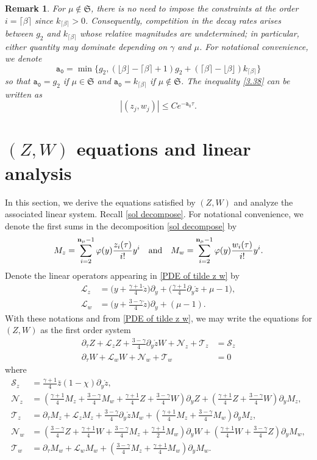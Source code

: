 \documentclass{article}
\newcommand{\ga}{\gamma}
\newcommand{\pa}{\partial}
\def\be{\begin{equation}}
\def\ee{\end{equation}}
\def\beqa{\begin{equation}\begin{aligned}}
\def\eeqa{\end{aligned}\end{equation}}
\def\espz{Z}
\def\espw{W}
\def\mz{M_z}
\def\mw{M_w}
\def\lz{\mathcal L_z}
\def\lw{\mathcal L_w}
\def\nz{\mathcal N_z}
\def\nw{\mathcal N_w}
\def\nmz{\mathcal T_z}
\def\nmw{\mathcal T_w}
\def\epzero{\mathtt{a_0}}
\def\ssmu{\mathfrak S}
\def\ndmu{{\bf{n}_{\mu}}}
\numberwithin{equation}{section}
\newtheorem{remark}[theorem]{Remark}
\begin{document}
\begin{remark}
    For $\mu\notin \ssmu$, there is no need to impose the constraints at the order $i=\lceil \beta \rceil$ since $k_{\lceil \beta \rceil}>0$. Consequently, competition in the decay rates arises between $g_2$ and $k_{\lceil \beta \rceil}$ whose relative magnitudes are undetermined; in particular, either quantity may dominate depending on $\ga$ and $\mu$. For notational convenience, we denote 
    \be\label{g0}
        \epzero = \min\{g_2, (\lfloor\beta\rfloor-\lceil\beta\rceil +1)g_2  +  (\lceil\beta\rceil -\lfloor\beta\rfloor)k_{\lceil \beta \rceil}\} 
    \ee so that $\epzero= g_2$ if $\mu \in \ssmu$ and $\epzero=k_{\lceil \beta \rceil} $ if $\mu\notin \ssmu$. 
  The inequality \eqref{3.38} can be written as 
  \be
        |(z_j,w_j)| \leq C e^{-\epzero\tau}.
  \ee
\end{remark}









\section{$(Z,W)$ equations and linear analysis} \label{section 4}


In this section, we derive the equations satisfied by $(Z,W)$ and analyze the associated linear system. Recall \eqref{sol decompose}. For notational convenience, we denote the first sums in the decomposition \eqref{sol decompose} by 
\be\label{def mz mw}
	\mz = \sum_{i=2}^{\ndmu-1} \varphi(y) \frac{z_i(\tau)}{i!}y^i \ \ \text{ and } \ \  \mw =  \sum_{i=2}^{\ndmu-1}  \varphi(y) \frac{w_i(\tau)}{i!}y^i.
\ee
Denote the linear operators appearing in \eqref{PDE of tilde z w} by 
\beqa\label{4.5}
	\lz &=  \Big(y+\frac{\ga+1}{4}\mathring z \Big) \partial_y   + \Big(\frac{\ga+1}{4}\partial_y \mathring z +\mu-1\Big),\\
	\lw &= \Big(y+\frac{3-\ga}{4}\mathring z \Big) \partial_y  + (\mu-1).
\eeqa
With these notations and from \eqref{PDE of tilde z w}, we may write the equations for $(Z,W)$ as the first order system 
\beqa\label{full system Z W}
	\partial_\tau \espz + \lz \espz +\frac{3-\ga}{4}\partial_y \mathring z \espw
     + \nz 
    + \nmz &= \mathcal S_z \\
	\partial_\tau \espw+ \lw \espw + \nw 
    + \nmw &=0 
\eeqa
where
\beqa\label{nz nmz}
    \mathcal S_z &=   \frac{\ga+1}{4} \bar z (1-\chi) \pa_y \mathring z ,\\ 
	\nz & =  (\frac{\ga+1}{4}\mz+\frac{3-\ga}{4}\mw+\frac{\ga+1}{4}\espz+\frac{3-\ga}{4}\espw)\partial_y\espz +(\frac{\ga+1}{4}\espz+\frac{3-\ga}{4} \espw)\pa_y\mz,\\
	\nmz & =\pa_\tau \mz+ \lz \mz+\frac{3-\ga}{4}\partial_y \mathring z \mw +(\frac{\ga+1}{4}\mz+\frac{3-\ga}{4}\mw)\partial_y\mz,\\
	\nw &= (\frac{3-\ga}{4}\espz+\frac{\ga+1}{4}\espw+\frac{3-\ga}{4}\mz+\frac{\ga+1}{2}\mw)\partial_y \espw+(\frac{\ga+1}{4}\espw+\frac{3-\ga}{4} \espz)\pa_y\mw ,\\
	\nmw &=\pa_\tau \mw+  \lw \mw+(\frac{3-\ga}{4}\mz+\frac{\ga+1}{4}\mw)\partial_y \mw.
\eeqa
\end{document}

